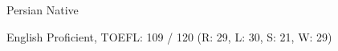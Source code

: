 

\begin{cvskills}

  \cvskill
    {Persian} %
    {Native} %

  \cvskill
    {English} %
    {Proficient, TOEFL: 109 / 120 (R: 29, L: 30, S: 21, W: 29)} %

\end{cvskills}
